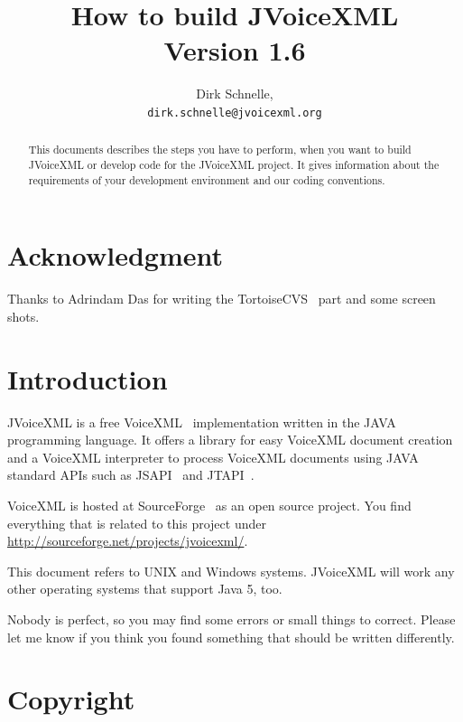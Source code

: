 \documentclass[11pt,a4paper]{article}
\title{How to build JVoiceXML \\
Version 1.6}
\author{Dirk Schnelle,  \\
  \texttt{dirk.schnelle@jvoicexml.org} }
\date{}
\begin{document}
\pagestyle{headings}

\maketitle

\begin{abstract}
This documents describes the steps you have to perform, when you want
to build JVoiceXML or develop code for the JVoiceXML project. It gives
information about the requirements of your development environment 
and our coding conventions.
\end{abstract}

\section*{Acknowledgment}

Thanks to Adrindam Das for writing the TortoiseCVS~\cite{tortoisecvs} 
part and some screen shots.

\section{Introduction}
\label{sec:introduction}

JVoiceXML is a free VoiceXML~\cite{w3.org:voicexml} implementation written in 
the JAVA programming language. It offers a library for easy VoiceXML
document creation and a VoiceXML interpreter to process 
VoiceXML documents using JAVA standard APIs such as JSAPI~\cite{sun:jsapi} and
JTAPI~\cite{sun:jsapi}.

VoiceXML is hosted at SourceForge~\cite{sourceforge} as an open source project.
You find everything that is related to this project under
\url{http://sourceforge.net/projects/jvoicexml/}.

This document refers to UNIX and Windows systems. JVoiceXML will work 
any other operating systems that support Java 5, too.

Nobody is perfect, so you may find some errors or small things to correct.
Please let me know if you think you found something that should be written
differently.

\section{Copyright}
\label{sec:copyright}
\end{document}
